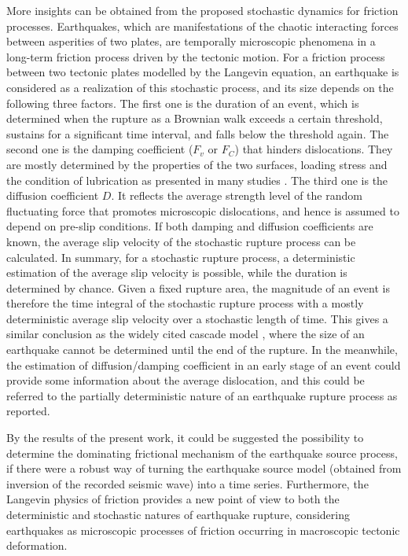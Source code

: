 \documentclass[%
 aip,
rsi,%
 amsmath,amssymb,
 reprint,%
]{revtex4-1}
\begin{document}
More insights can be obtained from the proposed stochastic dynamics for friction processes. Earthquakes, which are manifestations of the chaotic interacting forces between asperities of two plates, are temporally microscopic phenomena in a long-term friction process driven by the tectonic motion.
For a friction process between two tectonic plates modelled by the Langevin equation, an earthquake is considered as a realization of this stochastic process, and its size depends on the following three factors.
The first one is the duration of an event, which is determined when the rupture as a Brownian walk exceeds a certain threshold, sustains for a significant time interval, and falls below the threshold again.
The second one is the damping coefficient ($F_v$ or $F_C$) that hinders dislocations.
They are mostly determined by the properties of the two surfaces, loading stress and the condition of lubrication as presented in many studies \cite{hess_friction_1990,brodsky_elastohydrodynamic_2001,armstrong-helouvry_control_1991,nosonovsky_entropy_2010}.
The third one is the diffusion coefficient $D$. It reflects the average strength level of the random fluctuating force that promotes microscopic dislocations, and hence is assumed to depend on pre-slip conditions.
If both damping and diffusion coefficients are known, the average slip velocity of the stochastic rupture process can be calculated\cite{wu_stochastic_2018}.
In summary, for a stochastic rupture process, a deterministic estimation of the average slip velocity is possible, while the duration is determined by chance.
Given a fixed rupture area, the magnitude of an event is therefore the time integral of the stochastic rupture process with a mostly deterministic average slip velocity over a stochastic length of time.
This gives a similar conclusion as the widely cited cascade model \cite{kilb_initial_1999,ellsworth_observation_1998,brune_implications_1979}, where the size of an earthquake cannot be determined until the end of the rupture.
In the meanwhile, the estimation of diffusion/damping coefficient in an early stage of an event could provide some information about the average dislocation, and this could be referred to the partially deterministic nature of an earthquake rupture process as reported\cite{olson_deterministic_2005,wu_magnitude_2006}.

By the results of the present work, it could be suggested the possibility to determine the dominating frictional mechanism of the earthquake source process, if there were a robust way of turning the earthquake source model (obtained from inversion of the recorded seismic wave) into a time series.
Furthermore, the Langevin physics of friction provides a new point of view to both the deterministic and stochastic natures of earthquake rupture, considering earthquakes as microscopic processes of friction occurring in macroscopic tectonic deformation.
\end{document}
